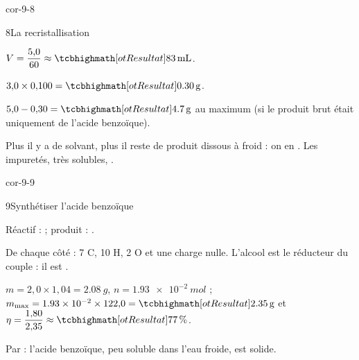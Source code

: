 \begin{blocLivre}{cor-9-8}
\begin{corrige}{8}{La recristallisation}
\begin{questions}
\item $V=\dfrac{5{,}0}{60}\approx\res{\qty{83}{mL}}$.
\item $3{,}0\times0{,}100=\res{\qty{0,30}{g}}$.
\item $5{,}0-0{,}30=\res{\qty{4,7}{g}}$ au maximum (si le produit brut était uniquement de l'acide benzoïque).
\item Plus il y a de solvant, plus il reste de produit dissous à froid : on en . Les impuretés, très
solubles, .
\end{questions}
\end{corrige}
\end{blocLivre}
\begin{blocLivre}{cor-9-9}
\begin{corrige}{9}{Synthétiser l'acide benzoïque}
\begin{questions}
\item Réactif :  ; produit : .
\item De chaque côté : 7 C, 10 H, 2 O et une charge nulle. L'alcool est le réducteur du couple : il est .
\item $m=2{,}0\times1{,}04=\qty{2,08}{g}$, $n=\qty{1,93e-2}{mol}$ ; $m_\text{max}=\num{1.93e-2}\times122{,}0=\res{\qty{2,35}{g}}$ et $\eta=\dfrac{1{,}80}{2{,}35}\approx\res{\qty{77}{\percent}}$.
\item Par  : l'acide benzoïque, peu soluble dans l'eau froide, est solide.
\end{questions}
\end{corrige}
\end{blocLivre}
